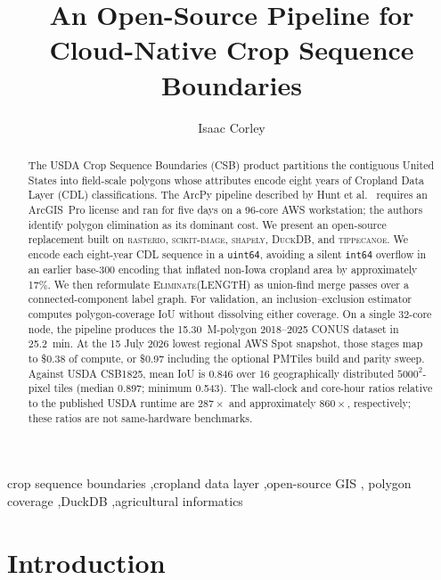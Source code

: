 \documentclass[preprint,12pt]{elsarticle}
\begin{document}
\begin{frontmatter}

\title{An Open-Source Pipeline for Cloud-Native Crop Sequence Boundaries}

\author[a]{Isaac Corley}

\begin{abstract}
The USDA Crop Sequence Boundaries (CSB) product partitions the contiguous
United States into field-scale polygons whose attributes encode eight years
of Cropland Data Layer (CDL) classifications. The ArcPy pipeline described by
Hunt et al.~\cite{hunt2024csb} requires an ArcGIS~Pro license and ran for five
days on a 96-core AWS workstation; the authors identify polygon elimination
as its dominant cost. We present an open-source replacement built on
\textsc{rasterio}, \textsc{scikit-image}, \textsc{shapely}, \textsc{DuckDB},
and \textsc{tippecanoe}. We encode each eight-year CDL sequence in a
\texttt{uint64}, avoiding a silent \texttt{int64} overflow in an earlier
base-300 encoding that inflated non-Iowa cropland area by approximately 17\%.
We then reformulate \textsc{Eliminate(LENGTH)} as union-find merge passes over
a connected-component label graph. For validation, an inclusion--exclusion
estimator computes polygon-coverage IoU without dissolving either coverage.
On a single 32-core node, the pipeline produces the 15.30~M-polygon 2018--2025
CONUS dataset in 25.2~min. At the 15 July 2026 lowest regional AWS Spot
snapshot, those stages map to \$0.38 of compute, or \$0.97 including the
optional PMTiles build and parity sweep. Against USDA CSB1825, mean IoU is
0.846 over 16 geographically distributed $5000^2$-pixel tiles (median 0.897;
minimum 0.543). The wall-clock and core-hour ratios relative to the published
USDA runtime are $287\times$ and approximately $860\times$, respectively;
these ratios are not same-hardware benchmarks.
\end{abstract}

\begin{keyword}
crop sequence boundaries \sep cropland data layer \sep open-source GIS \sep
polygon coverage \sep DuckDB \sep agricultural informatics
\end{keyword}

\end{frontmatter}

\section{Introduction}
\label{sec:intro}
\end{document}
